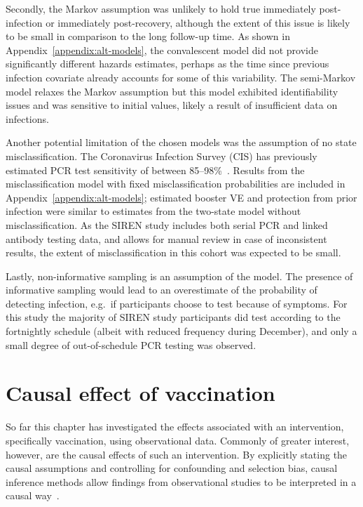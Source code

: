 Secondly, the Markov assumption was unlikely to hold true immediately post-infection or immediately post-recovery, although the extent of this issue is likely to be small in comparison to the long follow-up time. As shown in Appendix~\ref{appendix:alt-models}, the convalescent model did not provide significantly different hazards estimates, perhaps as the time since previous infection covariate already accounts for some of this variability. The semi-Markov model relaxes the Markov assumption but this model exhibited identifiability issues and was sensitive to initial values, likely a result of insufficient data on infections.

Another potential limitation of the chosen models was the assumption of no state misclassification. The Coronavirus Infection Survey (CIS) has previously estimated PCR test sensitivity of between 85--98\%~\parencite{Wei2023-ry}. Results from the misclassification model with fixed misclassification probabilities are included in Appendix~\ref{appendix:alt-models}; estimated booster VE and protection from prior infection were similar to estimates from the two-state model without misclassification. As the SIREN study includes both serial PCR and linked antibody testing data, and allows for manual review in case of inconsistent results, the extent of misclassification in this cohort was expected to be small.

Lastly, non-informative sampling is an assumption of the model. The presence of informative sampling would lead to an overestimate of the probability of detecting infection, e.g.\ if participants choose to test because of symptoms. For this study the majority of SIREN study participants did test according to the fortnightly schedule (albeit with reduced frequency during December), and only a small degree of out-of-schedule PCR testing was observed.

\section{Causal effect of vaccination}\label{sec:siren-causal}

So far this chapter has investigated the effects associated with an intervention, specifically vaccination, using observational data. Commonly of greater interest, however, are the causal effects of such an intervention. By explicitly stating the causal assumptions and controlling for confounding and selection bias, causal inference methods allow findings from observational studies to be interpreted in a causal way~\parencite{Ryalen2020-nl, Hernan2006-ei}.

